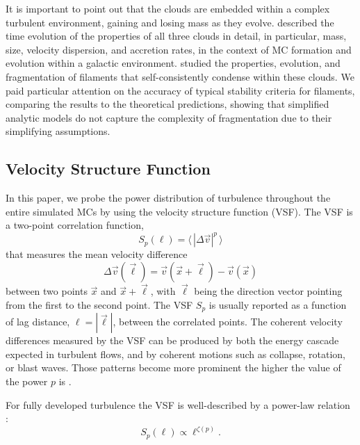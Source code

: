 It is important to point out that the clouds are embedded within a complex turbulent environment, gaining and losing mass as they evolve.
 described the time evolution of the properties of all three clouds in detail, in particular, mass, size, velocity dispersion, and accretion rates, in the context of MC formation and evolution within a galactic environment.
 studied the properties, evolution, and fragmentation of filaments that self-consistently condense within these clouds. 
We paid particular attention on the accuracy of typical stability criteria for filaments, comparing the results to the theoretical predictions, showing that simplified analytic models do not capture the complexity of fragmentation due to their simplifying assumptions.


\subsection{Velocity Structure Function}\label{methods:vsf}

In this paper, we probe the power distribution of turbulence throughout the entire simulated MCs by using the velocity structure function (VSF).
The VSF is a two-point correlation function,
\begin{equation}
	{S}_p (\ell) = \langle \, |\Delta \vec{v}|^p  \, \rangle
	\label{equ:method:def_vsf}
\end{equation}
that measures the mean velocity difference 
\begin{equation}
    \Delta \vec{v} (\vec{\ell}) = \vec{v}(\vec{x}+\vec{\ell}) - \vec{v}(\vec{x})
\end{equation} 
between two points $\vec{x}$ and $\vec{x}+\vec{\ell}$, with $\vec{\ell}$ being the direction vector pointing from the first to the second point.
The VSF $S_p$ is usually reported as a function of lag distance, $\ell = |\vec{\ell}|$, between the correlated points.
The coherent velocity differences measured by the VSF can be produced by both the energy cascade expected in turbulent flows, and by coherent motions such as collapse, rotation, or blast waves.
Those patterns become more prominent the higher the value of the power $p$ is \citep{Heyer2004}.

For fully developed turbulence the VSF is well-described by a power-law relation \citep{Kolmogorov1941,She1994,Boldyrev2002}:
\begin{equation}
	\mathit{S}_p (\ell) \propto \ell^{\zeta(p)}.
	\label{equ:method:propto_zeta}
\end{equation}

